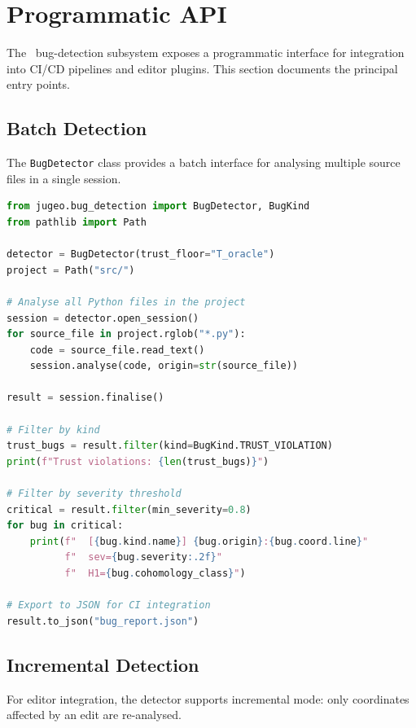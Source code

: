 \documentclass[11pt]{article}
\begin{document}
\section{Programmatic API}\label{sec:api}

The \JuGeo\ bug-detection subsystem exposes a programmatic interface
for integration into CI/CD pipelines and editor plugins.  This section
documents the principal entry points.

\subsection{Batch Detection}

The \texttt{BugDetector} class provides a batch interface for analysing
multiple source files in a single session.

\begin{lstlisting}[language=Python, caption={Batch bug detection across a project directory
  with filtering by kind and severity.}]
from jugeo.bug_detection import BugDetector, BugKind
from pathlib import Path

detector = BugDetector(trust_floor="T_oracle")
project = Path("src/")

# Analyse all Python files in the project
session = detector.open_session()
for source_file in project.rglob("*.py"):
    code = source_file.read_text()
    session.analyse(code, origin=str(source_file))

result = session.finalise()

# Filter by kind
trust_bugs = result.filter(kind=BugKind.TRUST_VIOLATION)
print(f"Trust violations: {len(trust_bugs)}")

# Filter by severity threshold
critical = result.filter(min_severity=0.8)
for bug in critical:
    print(f"  [{bug.kind.name}] {bug.origin}:{bug.coord.line}"
          f"  sev={bug.severity:.2f}"
          f"  H1={bug.cohomology_class}")

# Export to JSON for CI integration
result.to_json("bug_report.json")
\end{lstlisting}

\subsection{Incremental Detection}

For editor integration, the detector supports incremental mode:
only coordinates affected by an edit are re-analysed.
\end{document}
